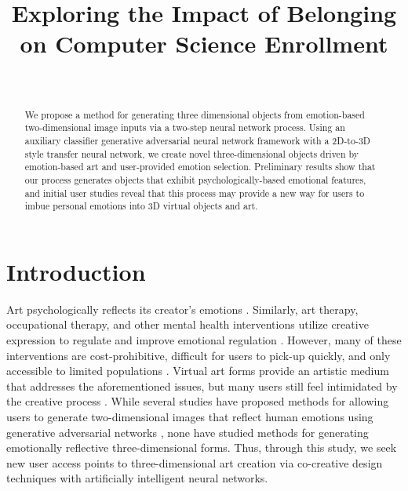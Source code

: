\documentclass{sigchi}
\begin{document}
\title{Exploring the Impact of Belonging on Computer Science Enrollment}

\author{%
  \\
}

\maketitle

\begin{abstract}
We propose a method for generating three dimensional objects from emotion-based two-dimensional image inputs via a two-step neural network process. Using an auxiliary classifier generative adversarial neural network framework with a 2D-to-3D style transfer neural network, we create novel three-dimensional objects driven by emotion-based art and user-provided emotion selection. Preliminary results show that our process generates objects that exhibit psychologically-based emotional features, and initial user studies reveal that this process may provide a new way for users to imbue personal emotions into 3D virtual objects and art.
\end{abstract}


\section{Introduction}

Art psychologically reflects its creator’s emotions \cite{AlvarezMelis2017TheEG}. Similarly, art therapy, occupational therapy, and other mental health interventions utilize creative expression to regulate and improve emotional regulation \cite{article}. However, many of these interventions are cost-prohibitive, difficult for users to pick-up quickly, and only accessible to limited populations \cite{article}. Virtual art forms provide an artistic medium that addresses the aforementioned issues, but many users still feel intimidated by the creative process \cite{article}. While several studies have proposed methods for allowing users to generate two-dimensional images that reflect human emotions using generative adversarial networks \cite{AlvarezMelis2017TheEG}, none have studied methods for generating emotionally reflective three-dimensional forms. Thus, through this study, we seek new user access points to three-dimensional art creation via co-creative design techniques with artificially intelligent neural networks.
\end{document}
